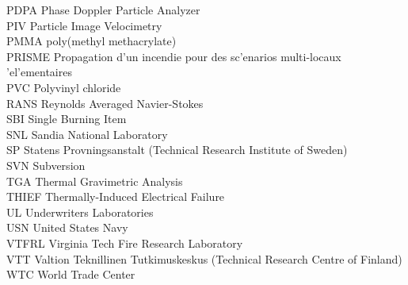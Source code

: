 \documentclass[11pt]{book}
\begin{document}
\begin{tabbing}
PDPA \> Phase Doppler Particle Analyzer \\
PIV \> Particle Image Velocimetry \\
PMMA \> poly(methyl methacrylate) \\
PRISME \> Propagation d'un incendie pour des sc\a'{e}narios multi-locaux \a'{e}l\a'{e}mentaires \\
PVC \> Polyvinyl chloride \\
RANS \> Reynolds Averaged Navier-Stokes \\
SBI \>  Single Burning Item \\
SNL \> Sandia National Laboratory \\
SP \>  Statens Provningsanstalt (Technical Research Institute of Sweden) \\
SVN \> Subversion \\
TGA \> Thermal Gravimetric Analysis \\
THIEF \> Thermally-Induced Electrical Failure \\
UL  \> Underwriters Laboratories \\
USN \> United States Navy \\
VTFRL \> Virginia Tech Fire Research Laboratory \\
VTT \> Valtion Teknillinen Tutkimuskeskus (Technical Research Centre of Finland) \\
WTC \> World Trade Center \\
\end{tabbing}



\mainmatter




























\end{document}
